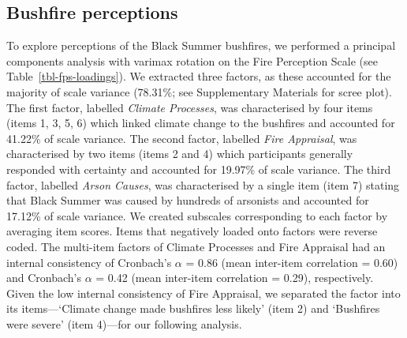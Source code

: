 \documentclass[
  letterpaper,
  DIV=11,
  numbers=noendperiod]{scrartcl}
\begin{document}
\subsection{Bushfire perceptions}\label{bushfire-perceptions}

To explore perceptions of the Black Summer bushfires, we performed a
principal components analysis with varimax rotation on the Fire
Perception Scale (see Table~\ref{tbl-fps-loadings}). We extracted three
factors, as these accounted for the majority of scale variance (78.31\%;
see Supplementary Materials for scree plot). The first factor, labelled
\emph{Climate Processes}, was characterised by four items (items 1, 3,
5, 6) which linked climate change to the bushfires and accounted for
41.22\% of scale variance. The second factor, labelled \emph{Fire
Appraisal}, was characterised by two items (items 2 and 4) which
participants generally responded with certainty and accounted for
19.97\% of scale variance. The third factor, labelled \emph{Arson
Causes}, was characterised by a single item (item 7) stating that Black
Summer was caused by hundreds of arsonists and accounted for 17.12\% of
scale variance. We created subscales corresponding to each factor by
averaging item scores. Items that negatively loaded onto factors were
reverse coded. The multi-item factors of Climate Processes and Fire
Appraisal had an internal consistency of Cronbach's \(\alpha\) = 0.86
(mean inter-item correlation = 0.60) and Cronbach's \(\alpha\) = 0.42
(mean inter-item correlation = 0.29), respectively. Given the low
internal consistency of Fire Appraisal, we separated the factor into its
items---`Climate change made bushfires less likely' (item 2) and
`Bushfires were severe' (item 4)---for our following analysis.
\end{document}
